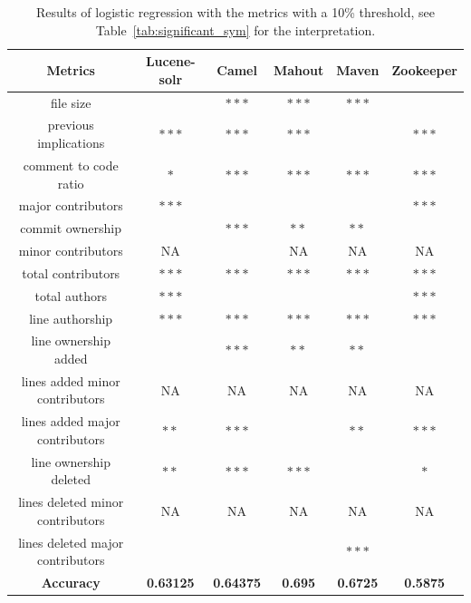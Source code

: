 \begin{table}[ht]
\centering
\caption{Results of logistic regression with the metrics with a 10\% threshold, see Table~\ref{tab:significant_sym} for the interpretation.}
\label{tab:logistic_regression10}
\begin{tabular}{|c|c|c|c|c|c|}
\hline
\textbf{Metrics} & \textbf{Lucene-solr} & \textbf{Camel} & \textbf{Mahout} & \textbf{Maven} & \textbf{Zookeeper} \\
\hline
file size & \textbf{} & \textbf{$\ast\ast\ast$} & \textbf{$\ast\ast\ast$} & \textbf{$\ast\ast\ast$} & \textbf{} \\
previous implications & \textbf{$\ast\ast\ast$} & \textbf{$\ast\ast\ast$} & \textbf{$\ast\ast\ast$} & \textbf{} & \textbf{$\ast\ast\ast$} \\
comment to code ratio & \textbf{$\ast$} & \textbf{$\ast\ast\ast$} & \textbf{$\ast\ast\ast$} & \textbf{$\ast\ast\ast$} & \textbf{$\ast\ast\ast$} \\
\hline
major contributors & \textbf{$\ast\ast\ast$} & \textbf{} & \textbf{} & \textbf{} & \textbf{$\ast\ast\ast$} \\
commit ownership & \textbf{} & \textbf{$\ast\ast\ast$} & \textbf{$\ast\ast$} & \textbf{$\ast\ast$} & \textbf{} \\
minor contributors & NA & \textbf{} & NA & NA & NA \\
total contributors & \textbf{$\ast\ast\ast$} & \textbf{$\ast\ast\ast$} & \textbf{$\ast\ast\ast$} & \textbf{$\ast\ast\ast$} & \textbf{$\ast\ast\ast$} \\
\hline
total authors & \textbf{$\ast\ast\ast$} & \textbf{} & \textbf{} & \textbf{} & \textbf{$\ast\ast\ast$} \\
line authorship & \textbf{$\ast\ast\ast$} & \textbf{$\ast\ast\ast$} & \textbf{$\ast\ast\ast$} & \textbf{$\ast\ast\ast$} & \textbf{$\ast\ast\ast$} \\
\hline
line ownership added & \textbf{} & \textbf{$\ast\ast\ast$} & \textbf{$\ast\ast$} & \textbf{$\ast\ast$} & \textbf{} \\
lines added minor contributors & NA & NA & NA & NA & NA \\
lines added major contributors & \textbf{$\ast\ast$} & \textbf{$\ast\ast\ast$} & \textbf{} & \textbf{$\ast\ast$} & \textbf{$\ast\ast\ast$} \\
\hline
line ownership deleted & \textbf{$\ast\ast$} & \textbf{$\ast\ast\ast$} & \textbf{$\ast\ast\ast$} & \textbf{} & \textbf{$\ast$} \\
lines deleted minor contributors & NA & NA & NA & NA & NA \\
lines deleted major contributors & \textbf{} & \textbf{} & \textbf{} & \textbf{$\ast\ast\ast$} & \textbf{} \\
\hline
\textbf{Accuracy} & \textbf{0.63125} & \textbf{0.64375} & \textbf{0.695} & \textbf{0.6725} & \textbf{0.5875}\\
\hline
\end{tabular}
\end{table}




